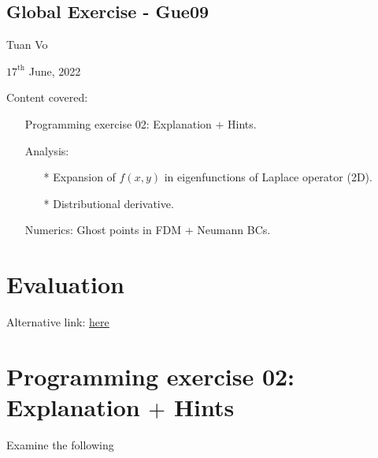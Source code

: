 \documentclass[12pt]{article}
\begin{document}
\begin{center}
	\section*{Global Exercise - Gue09}
\end{center}
\begin{center}
	Tuan Vo
\end{center}
\begin{center}
	$17^{\text{th}}$ June, 2022
\end{center}
Content covered:
\begin{itemize}
	\item[\checkmark] Programming exercise 02: Explanation $+$ Hints.
	\item[\checkmark] Analysis:
	      \begin{itemize}
		      \item[*] Expansion of $f(x,y)$ in eigenfunctions of Laplace operator (2D).
		      \item[*] Distributional derivative.
	      \end{itemize}
	\item[\checkmark] Numerics: Ghost points in FDM + Neumann BCs.
\end{itemize}
\section{Evaluation}


Alternative link:
\href{https://www.campus.rwth-aachen.de/evasys/online.php?pswd=5F6HTY8K3C}{here}
\newpage
\section{Programming exercise 02: Explanation $+$ Hints}
\begin{example}
	Examine the following
\end{example}

\newpage
{}

\newpage
{}

\newpage
{}
\end{document}

